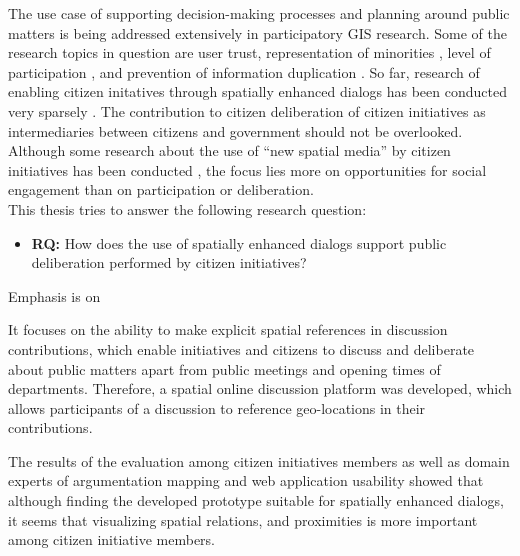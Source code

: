 The use case of supporting decision-making processes and planning around public matters is being addressed extensively in participatory GIS research. Some of the research topics in question are user trust, representation of minorities \cite{Carver2001_PPGIS_Cyberdemocracy}, level of participation \cite{Steinmann2005_Combination_Ladder_GIS}, and prevention of information duplication \cite{Hopfer2007_Communication}. So far, research of enabling citizen initatives through spatially enhanced dialogs has been conducted very sparsely \cite{Cai2009_spatial_annotation_deliberation}. The contribution to citizen deliberation of citizen initiatives as intermediaries between citizens and government should not be overlooked. Although some research about the use of ``new spatial media'' by citizen initiatives has been conducted \cite{Elwood2013_NewSpatialMedia}, the focus lies more on opportunities for social engagement than on participation or deliberation.\\
This thesis tries to answer the following research question:
\begin{itemize}
  \item[] \textbf{RQ:} How does the use of spatially enhanced dialogs support public deliberation performed by citizen initiatives?
\end{itemize}

Emphasis is on 


It focuses on the ability to make explicit spatial references in discussion contributions, which enable initiatives and citizens to discuss and deliberate about public matters apart from public meetings and opening times of departments. Therefore, a spatial online discussion platform was developed, which allows participants of a discussion to reference geo-locations in their contributions.  




The results of the evaluation among citizen initiatives members as well as domain experts of argumentation mapping and web application usability showed that although finding the developed prototype suitable for spatially enhanced dialogs, it seems that visualizing spatial relations, and proximities is more important among citizen initiative members.



